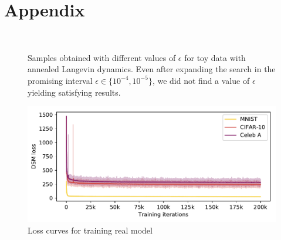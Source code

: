 \clearpage
\section*{Appendix}

\vspace{5cm}

\begin{figure}[h!]
  \centering
     \\
     \caption{Samples obtained with different values of $\epsilon$ for toy data with annealed Langevin dynamics. Even after expanding the search in the promising interval $\epsilon \in \{10^{-4}, 10^{-5}\}$, we did not find a value of $\epsilon$ yielding satisfying results.}
     \label{fig:eps}
\end{figure}


\newpage


\begin{figure}[h!]
    \centering
    \includegraphics[width=0.90\linewidth]{figures/loss_real.pdf}
    \caption{Loss curves for training real model}
    \label{fig:losses}
\end{figure}

